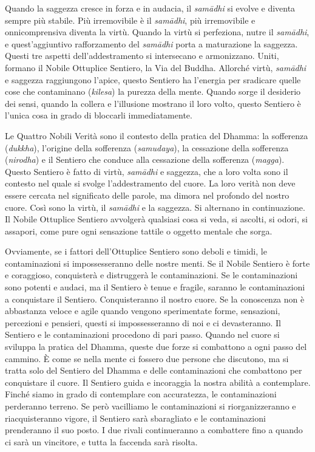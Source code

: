 Quando la saggezza cresce in forza e in audacia, il \emph{samādhi} si
evolve e diventa sempre più stabile. Più irremovibile è il
\emph{samādhi}, più irremovibile e onnicomprensiva diventa la virtù.
Quando la virtù si perfeziona, nutre il \emph{samādhi}, e
quest'aggiuntivo rafforzamento del \emph{samādhi} porta a maturazione la
saggezza. Questi tre aspetti dell'addestramento si intersecano e
armonizzano. Uniti, formano il Nobile Ottuplice Sentiero, la Via del
Buddha. Allorché virtù, \emph{samādhi} e saggezza raggiungono l'apice,
questo Sentiero ha l'energia per sradicare quelle cose che contaminano
(\emph{kilesa}) la purezza della mente. Quando sorge il desiderio dei
sensi, quando la collera e l'illusione mostrano il loro volto, questo
Sentiero è l'unica cosa in grado di bloccarli immediatamente.

Le Quattro Nobili Verità sono il contesto della pratica del Dhamma: la
sofferenza (\emph{dukkha}), l'origine della sofferenza
(\emph{samudaya}), la cessazione della sofferenza (\emph{nirodha}) e il
Sentiero che conduce alla cessazione della sofferenza (\emph{magga}).
Questo Sentiero è fatto di virtù, \emph{samādhi} e saggezza, che a loro
volta sono il contesto nel quale si svolge l'addestramento del cuore. La
loro verità non deve essere cercata nel significato delle parole, ma
dimora nel profondo del nostro cuore. Così sono la virtù, il
\emph{samādhi} e la saggezza. Si alternano in continuazione. Il Nobile
Ottuplice Sentiero avvolgerà qualsiasi cosa si veda, si ascolti, si
odori, si assapori, come pure ogni sensazione tattile o oggetto mentale
che sorga.

Ovviamente, se i fattori dell'Ottuplice Sentiero sono deboli e timidi,
le contaminazioni si impossesseranno delle nostre menti. Se il Nobile
Sentiero è forte e coraggioso, conquisterà e distruggerà le
contaminazioni. Se le contaminazioni sono potenti e audaci, ma il
Sentiero è tenue e fragile, saranno le contaminazioni a conquistare il
Sentiero. Conquisteranno il nostro cuore. Se la conoscenza non è
abbastanza veloce e agile quando vengono sperimentate forme, sensazioni,
percezioni e pensieri, questi si impossesseranno di noi e ci
devasteranno. Il Sentiero e le contaminazioni procedono di pari passo.
Quando nel cuore si sviluppa la pratica del Dhamma, queste due forze si
combattono a ogni passo del cammino. È come se nella mente ci fossero
due persone che discutono, ma si tratta solo del Sentiero del Dhamma e
delle contaminazioni che combattono per conquistare il cuore. Il
Sentiero guida e incoraggia la nostra abilità a contemplare. Finché
siamo in grado di contemplare con accuratezza, le contaminazioni
perderanno terreno. Se però vacilliamo le contaminazioni si
riorganizzeranno e riacquisteranno vigore, il Sentiero sarà sbaragliato
e le contaminazioni prenderanno il suo posto. I due rivali continueranno
a combattere fino a quando ci sarà un vincitore, e tutta la faccenda
sarà risolta.


